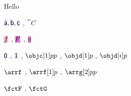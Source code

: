\documentclass[10pt,a4paper]{article}
\begin{document}
Hello

$\obj a,\obj b,\obj c$ , $\cat C$ \par
$\arr f$ , $\fct F$ , $\ntf \eta$ \par
$\obj0$ , $\obj1$ , $\objc[1]pp$ , $\objd[1]p$ , $\objd[i]p$ \par
$\arrf$ , $\arrf[1]p$ , $\arrg[2]pp$ \par
$\fctF$ , $\fctG$
\end{document}

